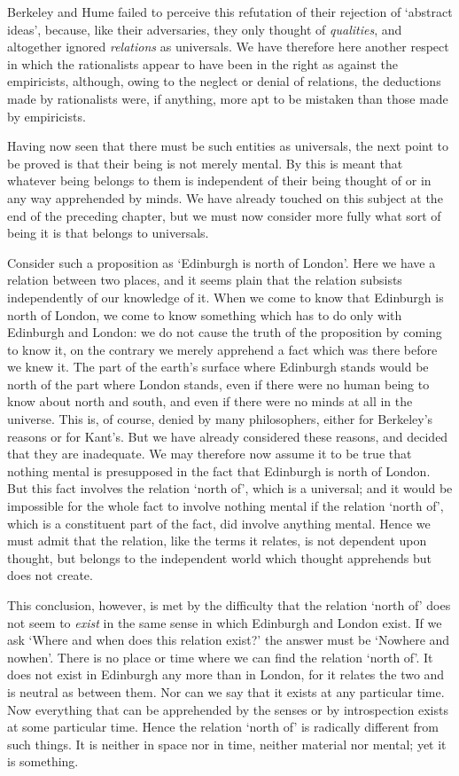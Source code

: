 \documentclass[oneside,letterpaper,12pt]{book}
\begin{document}
Berkeley and Hume failed to perceive this refutation of their rejection
of `abstract ideas', because, like their
adversaries, they only thought of \emph{qualities}, and altogether
ignored \emph{relations} as universals. We have therefore here another
respect in which the rationalists appear to have been in the right as
against the empiricists, although, owing to the neglect or denial of
relations, the deductions made by rationalists were, if anything, more
apt to be mistaken than those made by empiricists.

Having now seen that there must be such entities as universals, the next
point to be proved is that their being is not merely mental. By this is
meant that whatever being belongs to them is independent of their being
thought of or in any way apprehended by minds. We have already touched
on this subject at the end of the preceding chapter, but we must now
consider more fully what sort of being it is that belongs to universals.

Consider such a proposition as `Edinburgh is north of
London'. Here we have a relation between two places, and
it seems plain that the relation subsists independently of our knowledge
of it. When we come to know that Edinburgh is north of London, we come
to know something which has to do only with Edinburgh and London: we do
not cause the truth of the proposition by coming to know it, on the
contrary we merely apprehend a fact which was there before we knew it.
The part of the earth's surface where Edinburgh stands
would be north of the part where London stands, even if there were no
human being to know about north and south, and even if there were no
minds at all in the universe. This is, of course, denied by many
philosophers, either for Berkeley's reasons or for
Kant's. But we have already considered these reasons,
and decided that they are inadequate. We may therefore now assume it to
be true that nothing mental is presupposed in the fact that Edinburgh is
north of London. But this fact involves the relation
`north of', which is a universal; and it
would be impossible for the whole fact to involve nothing mental if the
relation `north of', which is a
constituent part of the fact, did involve anything mental. Hence we must
admit that the relation, like the terms it relates, is not dependent
upon thought, but belongs to the independent world which thought
apprehends but does not create.

This conclusion, however, is met by the difficulty that the relation
`north of' does not seem to
\emph{exist} in the same sense in which Edinburgh and London exist. If
we ask `Where and when does this relation
exist?' the answer must be \label{nowhereandnowhen} `Nowhere and
nowhen'. There is no place or time where we can find the
relation `north of'. It does not exist in
Edinburgh any more than in London, for it relates the two and is neutral
as between them. Nor can we say that it exists at any particular time.
Now everything that can be apprehended by the senses or by introspection
exists at some particular time. Hence the relation
`north of' is radically different from
such things. It is neither in space nor in time, neither material nor
mental; yet it is something.
\end{document}
